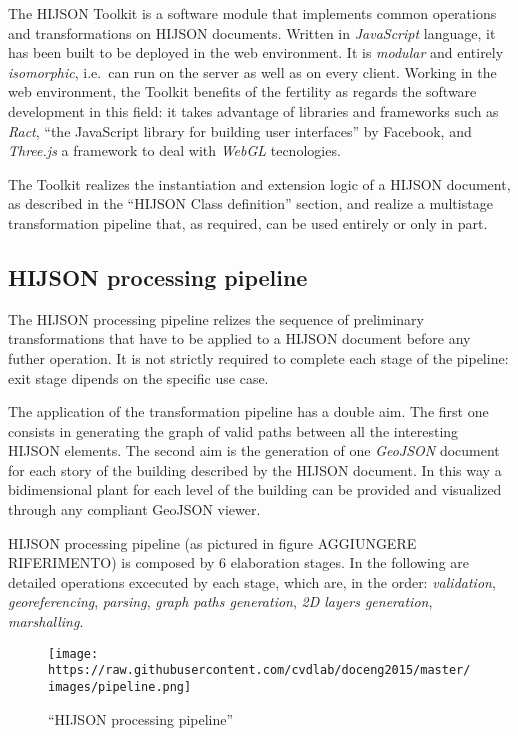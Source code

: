 \documentclass[]{article}
\begin{document}
The HIJSON Toolkit is a software module that implements common
operations and transformations on HIJSON documents. Written in
\emph{JavaScript} language, it has been built to be deployed in the web
environment. It is \emph{modular} and entirely \emph{isomorphic},
i.e.~can run on the server as well as on every client. Working in the
web environment, the Toolkit benefits of the fertility as regards the
software development in this field: it takes advantage of libraries and
frameworks such as \emph{Ract}, ``the JavaScript library for building
user interfaces'' by Facebook, and \emph{Three.js} a framework to deal
with \emph{WebGL} tecnologies.

The Toolkit realizes the instantiation and extension logic of a HIJSON
document, as described in the ``HIJSON Class definition'' section, and
realize a multistage transformation pipeline that, as required, can be
used entirely or only in part.

\subsection{HIJSON processing
pipeline}\label{hijson-processing-pipeline}

The HIJSON processing pipeline relizes the sequence of preliminary
transformations that have to be applied to a HIJSON document before any
futher operation. It is not strictly required to complete each stage of
the pipeline: exit stage dipends on the specific use case.

The application of the transformation pipeline has a double aim. The
first one consists in generating the graph of valid paths between all
the interesting HIJSON elements. The second aim is the generation of one
\emph{GeoJSON} document for each story of the building described by the
HIJSON document. In this way a bidimensional plant for each level of the
building can be provided and visualized through any compliant GeoJSON
viewer.

HIJSON processing pipeline (as pictured in figure AGGIUNGERE
RIFERIMENTO) is composed by 6 elaboration stages. In the following are
detailed operations excecuted by each stage, which are, in the order:
\emph{validation}, \emph{georeferencing}, \emph{parsing}, \emph{graph
paths generation}, \emph{2D layers generation}, \emph{marshalling}.

\begin{figure}[htbp]
\centering
\texttt{[image: https://raw.githubusercontent.com/cvdlab/doceng2015/master/images/pipeline.png]}
\caption{``HIJSON processing pipeline''}
\end{figure}
\end{document}
